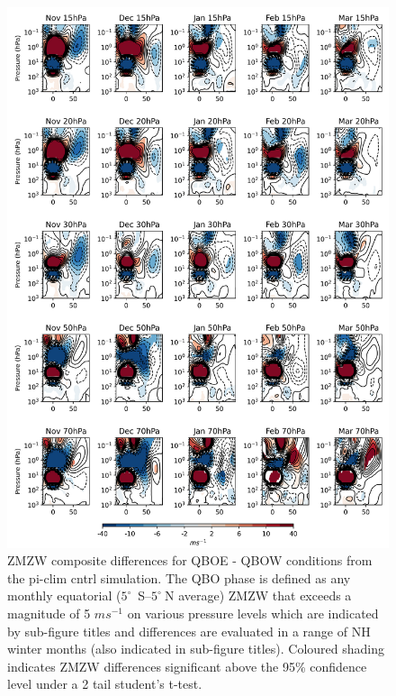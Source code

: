 \newpage
\begin{figure}[h!]
\begin{center}
\noindent\includegraphics[width = 0.8\linewidth]{Figures/Figures-deepQBO/ZMZW_composites_by_month_QBO_phases_U_piclim_MarQBO_vs_Mar_70hPa_5thresh.png}
\caption[ZMZW composites under different QBO phases in the pi-clim cntrl simulation]{ZMZW composite differences for QBOE - QBOW conditions from the pi-clim cntrl simulation. The QBO phase is defined as any monthly equatorial ($5^{\circ}$\ S--$5^{\circ}\ $N average) ZMZW that exceeds a magnitude of 5 $ms^{-1}$ on various pressure levels which are indicated by sub-figure titles and differences are evaluated in a range of NH winter months (also indicated in sub-figure titles). Coloured shading indicates ZMZW differences significant above the 95\% confidence level under a 2 tail student’s t-test.}
\label{fig:HT_piclim}
\end{center}
\end{figure}

